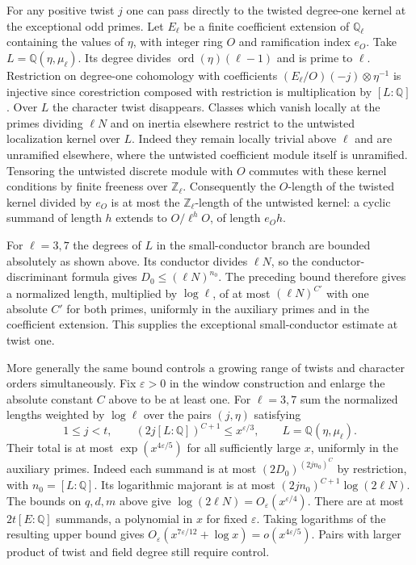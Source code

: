 \documentclass[11pt]{amsart}
\theoremstyle{definition}
\theoremstyle{remark}
\begin{document}
For any positive twist $j$ one can pass directly to the twisted
degree-one kernel at the exceptional odd primes. Let $E_\ell$ be a finite coefficient
extension of $\mathbb Q_\ell$ containing the values of $\eta$, with
integer ring $O$ and ramification index $e_O$. Take
$L=\mathbb Q(\eta,\mu_\ell)$. Its degree divides
$\operatorname{ord}(\eta)(\ell-1)$ and is prime to $\ell$.
Restriction on degree-one cohomology with coefficients
$(E_\ell/O)(-j)\otimes\eta^{-1}$ is injective since corestriction
composed with restriction is multiplication by $[L:\mathbb Q]$.
Over $L$ the character twist disappears. Classes which vanish locally
at the primes dividing $\ell N$ and on inertia elsewhere restrict
to the untwisted localization kernel over $L$. Indeed they remain
locally trivial above $\ell$ and are unramified elsewhere, where the
untwisted coefficient module itself is unramified. Tensoring the
untwisted discrete module with $O$ commutes with these kernel
conditions by finite freeness over $\mathbb Z_\ell$. Consequently the
$O$-length of the twisted kernel divided by $e_O$ is at most the
$\mathbb Z_\ell$-length of the untwisted kernel: a cyclic summand of
length $h$ extends to $O/\ell^h O$, of length $e_O h$.

For $\ell=3,7$ the degrees of $L$ in the small-conductor branch are
bounded absolutely as shown above. Its conductor divides $\ell N$,
so the conductor-discriminant formula gives $D_0\le(\ell N)^{n_0}$.
The preceding bound therefore gives a normalized length, multiplied
by $\log\ell$, of at most $(\ell N)^{C'}$ with one absolute $C'$
for both primes, uniformly in the auxiliary primes and in the
coefficient extension. This supplies the exceptional small-conductor
estimate at twist one.

More generally the same bound controls a growing range of twists and
character orders simultaneously. Fix $\varepsilon>0$ in the window
construction and enlarge the absolute constant $C$ above to be at
least one. For $\ell=3,7$ sum the normalized lengths weighted by
$\log\ell$ over the pairs $(j,\eta)$ satisfying
\[
 1\le j<t,\qquad (2j[L:\mathbb Q])^{C+1}\le x^{\varepsilon/3},
 \qquad L=\mathbb Q(\eta,\mu_\ell).
\]
Their total is at most $\exp(x^{4\varepsilon/5})$ for all sufficiently
large $x$, uniformly in the auxiliary primes. Indeed each summand is
at most $(2D_0)^{(2jn_0)^C}$ by restriction, with $n_0=[L:\mathbb Q]$.
Its logarithmic majorant is at most
$(2jn_0)^{C+1}\log(2\ell N)$. The bounds on $q,d,m$ above give
$\log(2\ell N)=O_\varepsilon(x^{\varepsilon/4})$.
There are at most $2t[E:\mathbb Q]$ summands, a polynomial in $x$
for fixed $\varepsilon$. Taking logarithms of the resulting upper
bound gives $O_\varepsilon(x^{7\varepsilon/12}+\log x)
=o(x^{4\varepsilon/5})$. Pairs with larger product of twist and
field degree still require control.
\end{document}
